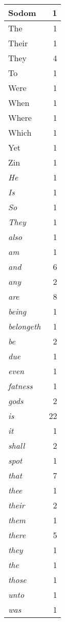 \begin{center}
\begin{longtable}{l|r}
Sodom & 1 \\ \hline
The & 1 \\ \hline
Their & 1 \\ \hline
They & 4 \\ \hline
To & 1 \\ \hline
Were & 1 \\ \hline
When & 1 \\ \hline
Where & 1 \\ \hline
Which & 1 \\ \hline
Yet & 1 \\ \hline
Zin & 1 \\ \hline
\emph{He} & 1 \\ \hline
\emph{Is} & 1 \\ \hline
\emph{So} & 1 \\ \hline
\emph{They} & 1 \\ \hline
\emph{also} & 1 \\ \hline
\emph{am} & 1 \\ \hline
\emph{and} & 6 \\ \hline
\emph{any} & 2 \\ \hline
\emph{are} & 8 \\ \hline
\emph{being} & 1 \\ \hline
\emph{belongeth} & 1 \\ \hline
\emph{be} & 2 \\ \hline
\emph{due} & 1 \\ \hline
\emph{even} & 1 \\ \hline
\emph{fatness} & 1 \\ \hline
\emph{gods} & 2 \\ \hline
\emph{is} & 22 \\ \hline
\emph{it} & 1 \\ \hline
\emph{shall} & 2 \\ \hline
\emph{spot} & 1 \\ \hline
\emph{that} & 7 \\ \hline
\emph{thee} & 1 \\ \hline
\emph{their} & 2 \\ \hline
\emph{them} & 1 \\ \hline
\emph{there} & 5 \\ \hline
\emph{they} & 1 \\ \hline
\emph{the} & 1 \\ \hline
\emph{those} & 1 \\ \hline
\emph{unto} & 1 \\ \hline
\emph{was} & 1 \\ \hline

\end{longtable}
\end{center}
